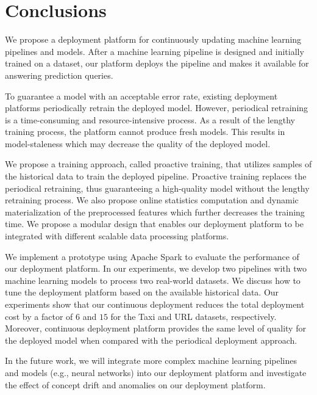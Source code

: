 \section{Conclusions} \label{conclusion}
We propose a deployment platform for continuously updating machine learning pipelines and models.
After a machine learning pipeline is designed and initially trained on a dataset, our platform deploys the pipeline and makes it available for answering prediction queries.

To guarantee a model with an acceptable error rate, existing deployment platforms periodically retrain the deployed model. 
However, periodical retraining is a time-consuming and resource-intensive process.
As a result of the lengthy training process, the platform cannot produce fresh models.
This results in model-staleness which may decrease the quality of the deployed model.

We propose a training approach, called proactive training, that utilizes samples of the historical data to train the deployed pipeline.
Proactive training replaces the periodical retraining, thus guaranteeing a high-quality model without the lengthy retraining process.
We also propose online statistics computation and dynamic materialization of the preprocessed features which further decreases the training time.
We propose a modular design that enables our deployment platform to be integrated with different scalable data processing platforms.

We implement a prototype using Apache Spark to evaluate the performance of our deployment platform.
In our experiments, we develop two pipelines with two machine learning models to process two real-world datasets.
We discuss how to tune the deployment platform based on the available historical data.
Our experiments show that our continuous deployment reduces the total deployment cost by a factor of $6$ and $15$ for the Taxi and URL datasets, respectively.
Moreover, continuous deployment platform provides the same level of quality for the deployed model when compared with the periodical deployment approach.

In the future work, we will integrate more complex machine learning pipelines and models (e.g., neural networks) into our deployment platform and investigate the effect of concept drift and anomalies on our deployment platform.

